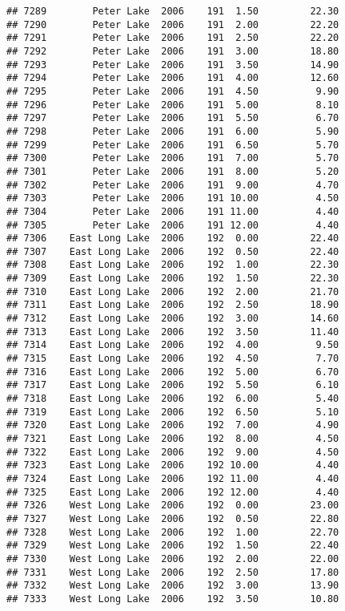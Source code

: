 \documentclass[
]{article}
\begin{document}
\begin{verbatim}
## 7289        Peter Lake  2006    191  1.50         22.30
## 7290        Peter Lake  2006    191  2.00         22.20
## 7291        Peter Lake  2006    191  2.50         22.20
## 7292        Peter Lake  2006    191  3.00         18.80
## 7293        Peter Lake  2006    191  3.50         14.90
## 7294        Peter Lake  2006    191  4.00         12.60
## 7295        Peter Lake  2006    191  4.50          9.90
## 7296        Peter Lake  2006    191  5.00          8.10
## 7297        Peter Lake  2006    191  5.50          6.70
## 7298        Peter Lake  2006    191  6.00          5.90
## 7299        Peter Lake  2006    191  6.50          5.70
## 7300        Peter Lake  2006    191  7.00          5.70
## 7301        Peter Lake  2006    191  8.00          5.20
## 7302        Peter Lake  2006    191  9.00          4.70
## 7303        Peter Lake  2006    191 10.00          4.50
## 7304        Peter Lake  2006    191 11.00          4.40
## 7305        Peter Lake  2006    191 12.00          4.40
## 7306    East Long Lake  2006    192  0.00         22.40
## 7307    East Long Lake  2006    192  0.50         22.40
## 7308    East Long Lake  2006    192  1.00         22.30
## 7309    East Long Lake  2006    192  1.50         22.30
## 7310    East Long Lake  2006    192  2.00         21.70
## 7311    East Long Lake  2006    192  2.50         18.90
## 7312    East Long Lake  2006    192  3.00         14.60
## 7313    East Long Lake  2006    192  3.50         11.40
## 7314    East Long Lake  2006    192  4.00          9.50
## 7315    East Long Lake  2006    192  4.50          7.70
## 7316    East Long Lake  2006    192  5.00          6.70
## 7317    East Long Lake  2006    192  5.50          6.10
## 7318    East Long Lake  2006    192  6.00          5.40
## 7319    East Long Lake  2006    192  6.50          5.10
## 7320    East Long Lake  2006    192  7.00          4.90
## 7321    East Long Lake  2006    192  8.00          4.50
## 7322    East Long Lake  2006    192  9.00          4.50
## 7323    East Long Lake  2006    192 10.00          4.40
## 7324    East Long Lake  2006    192 11.00          4.40
## 7325    East Long Lake  2006    192 12.00          4.40
## 7326    West Long Lake  2006    192  0.00         23.00
## 7327    West Long Lake  2006    192  0.50         22.80
## 7328    West Long Lake  2006    192  1.00         22.70
## 7329    West Long Lake  2006    192  1.50         22.40
## 7330    West Long Lake  2006    192  2.00         22.00
## 7331    West Long Lake  2006    192  2.50         17.80
## 7332    West Long Lake  2006    192  3.00         13.90
## 7333    West Long Lake  2006    192  3.50         10.80

\end{verbatim}
\end{document}
